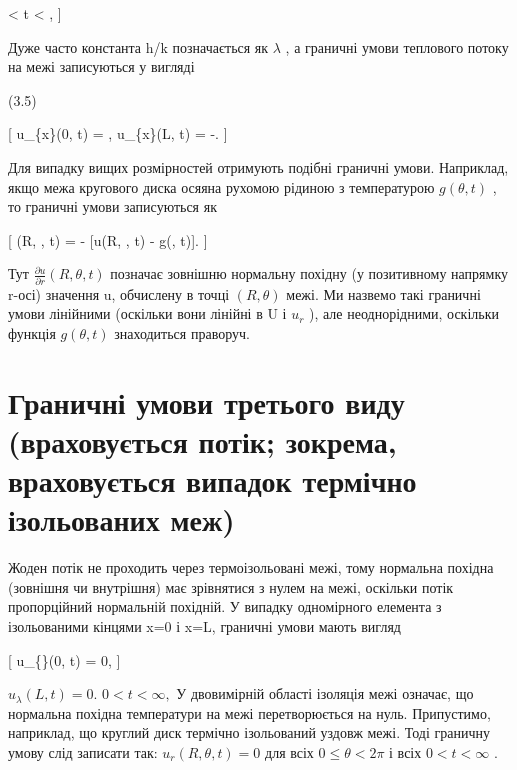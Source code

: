 \documentclass[
  ukrainian,
]{article}
\begin{document}
 \textless{} t \textless{} \infty, {]}

Дуже часто константа h/k позначається як \(\lambda\) , а граничні умови
теплового потоку на межі записуються у вигляді

(3.5)

{[} u\_\{x\}(0, t) = \lambda [u(0, t) - g_{1}(t)], u\_\{x\}(L, t) =
-\lambda [u(L, t) - g_{2}(t)]. {]}

Для випадку вищих розмірностей отримують подібні граничні умови.
Наприклад, якщо межа кругового диска осяяна рухомою рідиною з
температурою \(g(\theta,t)\) , то граничні умови записуються як

{[} (R, \theta, t) = - {[}u(R,
\theta, t) - g(\theta, t){]}. {]}

Тут \(\frac{\partial u}{\partial r}(R, \theta, t)\) позначає зовнішню
нормальну похідну (у позитивному напрямку r-осі) значення u, обчислену в
точці \((R, \theta)\) межі. Ми назвемо такі граничні умови лінійними
(оскільки вони лінійні в U і \(u_r\) ), але неоднорідними, оскільки
функція \(g(\theta, t)\) знаходиться праворуч.

\section{Граничні умови третього виду (враховується потік; зокрема,
враховується випадок термічно ізольованих
меж)}\label{ux433ux440ux430ux43dux438ux447ux43dux456-ux443ux43cux43eux432ux438-ux442ux440ux435ux442ux44cux43eux433ux43e-ux432ux438ux434ux443-ux432ux440ux430ux445ux43eux432ux443ux454ux442ux44cux441ux44f-ux43fux43eux442ux456ux43a-ux437ux43eux43aux440ux435ux43cux430-ux432ux440ux430ux445ux43eux432ux443ux454ux442ux44cux441ux44f-ux432ux438ux43fux430ux434ux43eux43a-ux442ux435ux440ux43cux456ux447ux43dux43e-ux456ux437ux43eux43bux44cux43eux432ux430ux43dux438ux445-ux43cux435ux436}

Жоден потік не проходить через термоізольовані межі, тому нормальна
похідна (зовнішня чи внутрішня) має зрівнятися з нулем на межі, оскільки
потік пропорційний нормальній похідній. У випадку одномірного елемента з
ізольованими кінцями x=0 і x=L, граничні умови мають вигляд

{[} u\_\{\lambda\}(0, t) = 0, {]}

\(u_{\lambda}(L, t) = 0.\) \(0 < t < \infty,\) У двовимірній області
ізоляція межі означає, що нормальна похідна температури на межі
перетворюється на нуль. Припустимо, наприклад, що круглий диск термічно
ізольований уздовж межі. Тоді граничну умову слід записати так:
\(u_r(R, \theta, t) = 0\) для всіх \(0 \le \theta < 2\pi\) і всіх
\(0 < t < \infty\) .
\end{document}
